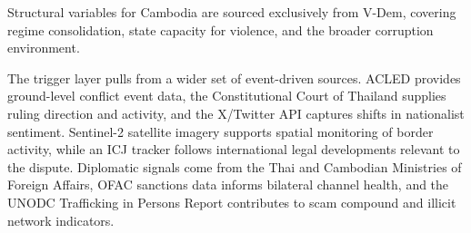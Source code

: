 \documentclass[12pt]{article}
\begin{document}
Structural variables for Cambodia are sourced exclusively from V-Dem, covering regime consolidation, state capacity for violence, and the broader corruption environment.

The trigger layer pulls from a wider set of event-driven sources. ACLED provides ground-level conflict event data, the Constitutional Court of Thailand supplies ruling direction and activity, and the X/Twitter API captures shifts in nationalist sentiment. Sentinel-2 satellite imagery supports spatial monitoring of border activity, while an ICJ tracker follows international legal developments relevant to the dispute. Diplomatic signals come from the Thai and Cambodian Ministries of Foreign Affairs, OFAC sanctions data informs bilateral channel health, and the UNODC Trafficking in Persons Report contributes to scam compound and illicit network indicators.
\end{document}
